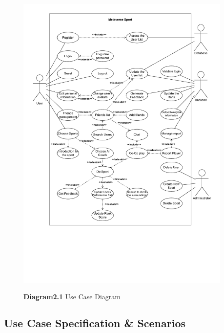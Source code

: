 \documentclass[a4paper]{article}
\begin{document}
	\begin{figure}[H]
		\centering
		\caption*{\textbf{Diagram2.1} Use Case Diagram}
		\includegraphics[width=0.95\textwidth]{images/UseCaseDiagram.pdf}
		\label{lable}
	\end{figure}
	\newpage

	\subsection{Use Case Specification \& Scenarios}

\end{document}
